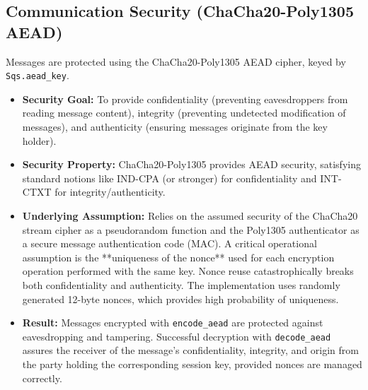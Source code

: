 \documentclass[11pt]{article}
\begin{document}
	\subsection{Communication Security (ChaCha20-Poly1305 AEAD)}
	Messages are protected using the ChaCha20-Poly1305 AEAD cipher, keyed by \texttt{Sqs.aead\_key}.
	\begin{itemize}
		\item \textbf{Security Goal:} To provide confidentiality (preventing eavesdroppers from reading message content), integrity (preventing undetected modification of messages), and authenticity (ensuring messages originate from the key holder).
		\item \textbf{Security Property:} ChaCha20-Poly1305 provides AEAD security, satisfying standard notions like IND-CPA (or stronger) for confidentiality and INT-CTXT for integrity/authenticity.
		\item \textbf{Underlying Assumption:} Relies on the assumed security of the ChaCha20 stream cipher as a pseudorandom function and the Poly1305 authenticator as a secure message authentication code (MAC). A critical operational assumption is the **uniqueness of the nonce** used for each encryption operation performed with the same key. Nonce reuse catastrophically breaks both confidentiality and authenticity. The implementation uses randomly generated 12-byte nonces, which provides high probability of uniqueness.
		\item \textbf{Result:} Messages encrypted with \texttt{encode\_aead} are protected against eavesdropping and tampering. Successful decryption with \texttt{decode\_aead} assures the receiver of the message's confidentiality, integrity, and origin from the party holding the corresponding session key, provided nonces are managed correctly.
	\end{itemize}
	
\end{document}
